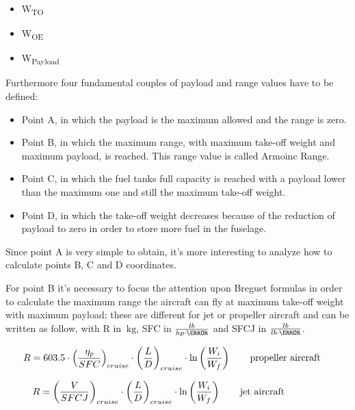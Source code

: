 \documentclass[a4paper,12pt,oneside]{book}
\begin{document}
\begin{itemize}
\item W\textsubscript{TO}
\item W\textsubscript{OE}
\item W\textsubscript{Payload}
\end{itemize}

Furthermore four fundamental couples of payload and range values have to be defined:

\begin{itemize}
\item Point A, in which the payload is the maximum allowed and the range is zero.
\item Point B, in which the maximum range, with maximum take-off weight and maximum payload, is reached. This range value is called Armoinc Range.
\item Point C, in which the fuel tanks full capacity is reached with a payload lower than the maximum one and still the maximum take-off weight.
\item Point D, in which the take-off weight decreases because of the reduction of payload to zero in order to store more fuel in the fuselage.
\end{itemize}

Since point A is very simple to obtain, it’s more interesting to analyze how to calculate points B, C and D coordinates.

For point B it’s necessary to focus the attention upon Breguet formulas in order to calculate the maximum range the aircraft can fly at maximum take-off weight with maximum payload; these are different for jet or propeller aircraft and can be written as follow, with R in $\SI{}{\kilogram}$, SFC in $\frac{lb}{hp\cdot\hour}$ and SFCJ in $\frac{lb}{lb\cdot\hour}$.

\begin{eqnarray}
R=603.5\cdot \left(\frac{\eta_{p}}{SFC}\right)_{cruise}\cdot \left(\frac{L}{D}\right)_{cruise}\cdot \ln\left(\frac{W_{i}}{W_{f}}\right) %
\qquad \textrm {\parbox[t][][t]{.25\linewidth } {\raggedright propeller aircraft}}
\label{eqn:Equation1.1}
\end{eqnarray}

\begin{eqnarray}
R=\left(\frac{V}{SFCJ}\right)_{cruise}\cdot \left(\frac{L}{D}\right)_{cruise}\cdot \ln\left(\frac{W_{i}}{W_{f}}\right) %
\qquad \textrm {\parbox[t][][t]{.25\linewidth} {jet aircraft}}
\label{eqn:Equation1.2}
\end{eqnarray}
\end{document}
